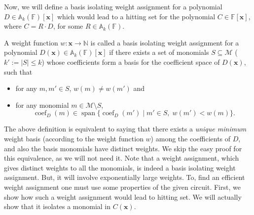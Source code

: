 \documentclass[final,oneeqnum, onethmnum, onefignum]{siamltex1213}
\newcommand{\N}{\mathbb N}
\newcommand{\A}{\mathbb A}
\newcommand{\Zp}{\mathbb{Z}_+}
\newcommand{\F}{\mathbb F}
\newcommand{\abs}[1]{\lvert #1 \rvert}
\newcommand{\M}{\mathcal M}
\newcommand{\coeff}{\operatorname{coef}}
\DeclareMathOperator{\Span}{span}
\newcommand{\x}{\mathbf{x}}
\newcommand{\xe}{\mathbf{x}^e}
\begin{document}
Now, we will define a {basis isolating weight assignment} for a polynomial
$D \in \A_k(\F)[\mathbf{x}]$ which would lead to a hitting set for the polynomial
$C \in \F[\mathbf{x}]$, where $C = R \cdot D$, for some $R \in \A_k(\F)$.


\begin{definition}
A weight function $w \colon \mathbf{x} \to \N$ is called a basis isolating
weight assignment for a polynomial $D(\mathbf{x}) \in \A_k(\F)[\mathbf{x}]$ 
if there exists 
a set of monomials $S \subseteq \M$ ($k' := \abs{S} \leq k$)
whose coefficients form a basis for the coefficient space of $D({\mathbf x})$, 
such that 
\begin{itemize}
\item for any $m, m' \in S$, $w(m) \neq w(m')$ and
\item for any monomial $m \in \M \setminus S$, 
$$ \coeff_D(m) \in \Span \{ \coeff_D(m') \mid m' \in S, \; w(m') < w(m) \}.$$
\end{itemize}
\end{definition}

The above definition is equivalent to saying that there exists
a {\em unique minimum} weight basis (according to the weight function $w$)
among the coefficients of $D$, and also the basis monomials have distinct weights. 
We skip the easy proof for this equivalence, as we will not need it. 
Note that a weight assignment, which gives distinct weights to all the monomials,
is indeed a basis isolating weight assignment. 
But, it will involve exponentially large weights. To, find an efficient
weight assignment one must use some properties of the given circuit.
First, we show how such a weight assignment would lead to hitting set.
We will actually show that it isolates a monomial in $C(\x)$.
\end{document}
